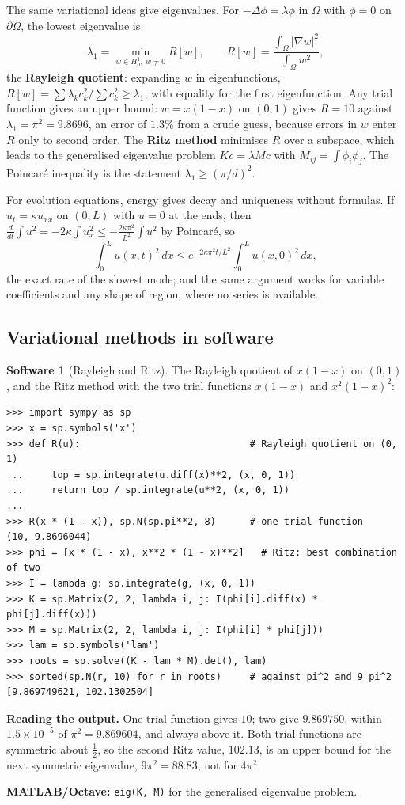 \documentclass[11pt,a4paper]{article}
\numberwithin{equation}{section}
\theoremstyle{definition}
\newtheorem{software}[thm]{Software}
\begin{document}
The same variational ideas give eigenvalues. For $-\Delta\phi = \lambda\phi$ in $\Omega$ with $\phi = 0$ on $\partial\Omega$, the lowest eigenvalue is
\[
\lambda_1 = \min_{w \in H^1_0,\ w \neq 0}R[w], \qquad R[w] = \frac{\int_\Omega|\nabla w|^2}{\int_\Omega w^2} ,
\]
the \textbf{Rayleigh quotient}: expanding $w$ in eigenfunctions, $R[w] = \sum\lambda_kc_k^2/\sum c_k^2 \geq \lambda_1$, with equality for the first eigenfunction. Any trial function gives an upper bound: $w = x(1 - x)$ on $(0, 1)$ gives $R = 10$ against $\lambda_1 = \pi^2 = 9.8696$, an error of $1.3\%$ from a
crude guess, because errors in $w$ enter $R$ only to second order. The \textbf{Ritz method} minimises $R$ over a subspace, which leads to the generalised eigenvalue problem $Kc = \lambda Mc$ with $M_{ij} = \int\phi_i\phi_j$. The Poincar\'e inequality is the statement $\lambda_1 \geq (\pi/d)^2$.

For evolution equations, energy gives decay and uniqueness without formulas. If $u_t = \kappa u_{xx}$ on $(0, L)$ with $u = 0$ at the ends, then $\frac{d}{dt}\int u^2 = -2\kappa\int u_x^2 \leq -\frac{2\kappa\pi^2}{L^2}\int u^2$ by Poincar\'e, so
\[
\int_0^Lu(x, t)^2\,dx \leq e^{-2\kappa\pi^2t/L^2}\int_0^Lu(x, 0)^2\,dx ,
\]
the exact rate of the slowest mode; and the same argument works for variable coefficients and any shape of region, where no series is available.

\subsection{Variational methods in software}
\label{ssec:software12}

\begin{software}[Rayleigh and Ritz]
\label{sw:ritz}
The Rayleigh quotient of $x(1 - x)$ on $(0, 1)$, and the Ritz method with the two trial functions $x(1 - x)$ and $x^2(1 - x)^2$:
{\small\begin{verbatim}
>>> import sympy as sp
>>> x = sp.symbols('x')
>>> def R(u):                              # Rayleigh quotient on (0, 1)
...     top = sp.integrate(u.diff(x)**2, (x, 0, 1))
...     return top / sp.integrate(u**2, (x, 0, 1))
...
>>> R(x * (1 - x)), sp.N(sp.pi**2, 8)      # one trial function
(10, 9.8696044)
>>> phi = [x * (1 - x), x**2 * (1 - x)**2]   # Ritz: best combination of two
>>> I = lambda g: sp.integrate(g, (x, 0, 1))
>>> K = sp.Matrix(2, 2, lambda i, j: I(phi[i].diff(x) * phi[j].diff(x)))
>>> M = sp.Matrix(2, 2, lambda i, j: I(phi[i] * phi[j]))
>>> lam = sp.symbols('lam')
>>> roots = sp.solve((K - lam * M).det(), lam)
>>> sorted(sp.N(r, 10) for r in roots)     # against pi^2 and 9 pi^2
[9.869749621, 102.1302504]
\end{verbatim}}
\textbf{Reading the output.} One trial function gives $10$; two give $9.869750$, within $1.5 \times 10^{-5}$ of $\pi^2 = 9.869604$, and always above it. Both trial functions are symmetric about $\frac12$, so the second Ritz value, $102.13$, is an upper bound for the next symmetric eigenvalue, $9\pi^2 = 88.83$, not for $4\pi^2$.

\textbf{MATLAB/Octave:} \texttt{eig(K, M)} for the generalised eigenvalue problem.
\end{software}
\end{document}
